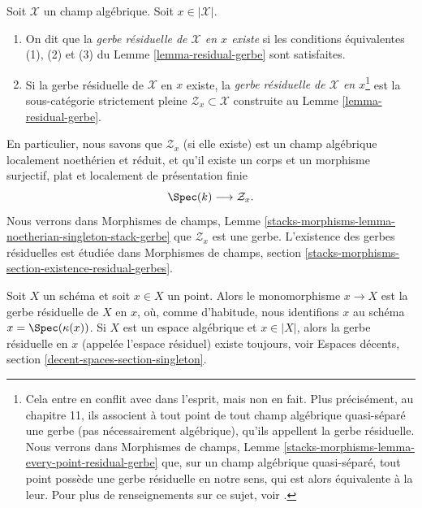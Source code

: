 \begin{definition}
\label{definition-residual-gerbe}
Soit $\mathcal{X}$ un champ algébrique. Soit $x \in |\mathcal{X}|$.
\begin{enumerate}
\item On dit que la {\it gerbe résiduelle de $\mathcal{X}$ en $x$ existe}
si les conditions équivalentes (1), (2) et (3) du
Lemme \ref{lemma-residual-gerbe}
sont satisfaites.
\item Si la gerbe résiduelle de $\mathcal{X}$ en $x$ existe, la
{\it gerbe résiduelle de $\mathcal{X}$ en $x$}\footnote{Cela entre en conflit avec
\cite{LM-B} dans l'esprit, mais non en fait. Plus précisément, au chapitre 11, ils associent
à tout point de tout champ algébrique quasi-séparé une gerbe (pas nécessairement
algébrique), qu'ils appellent la gerbe résiduelle. Nous verrons dans
Morphismes de champs, Lemme
\ref{stacks-morphisms-lemma-every-point-residual-gerbe}
que, sur un champ algébrique quasi-séparé, tout point
possède une gerbe résiduelle en notre sens, qui est alors équivalente à la leur. Pour
plus de renseignements sur ce sujet, voir
\cite[Annexe B]{rydh_etale_devissage}.}
est la sous-catégorie strictement pleine
$\mathcal{Z}_x \subset \mathcal{X}$ construite au
Lemme \ref{lemma-residual-gerbe}.
\end{enumerate}
\end{definition}

\noindent
En particulier, nous savons que $\mathcal{Z}_x$ (si elle existe) est un
champ algébrique localement noethérien et réduit, et qu'il existe un
corps et un morphisme surjectif, plat et localement de présentation finie
$$
\Spec(k) \longrightarrow \mathcal{Z}_x.
$$
Nous verrons dans
Morphismes de champs, Lemme
\ref{stacks-morphisms-lemma-noetherian-singleton-stack-gerbe}
que $\mathcal{Z}_x$ est une gerbe. L'existence des gerbes résiduelles est
étudiée dans Morphismes de champs, section
\ref{stacks-morphisms-section-existence-residual-gerbes}.

\begin{example}
\label{example-residual-gerbe}
Soit $X$ un schéma et soit $x \in X$ un point. Alors le monomorphisme
$x \to X$ est la gerbe résiduelle de $X$ en $x$, où, comme d'habitude, nous identifions
$x$ au schéma $x = \Spec(\kappa(x))$. Si $X$ est un espace algébrique
et $x \in |X|$, alors la gerbe résiduelle en $x$ (appelée
l'espace résiduel) existe toujours, voir
Espaces décents, section \ref{decent-spaces-section-singleton}.
\end{example}

